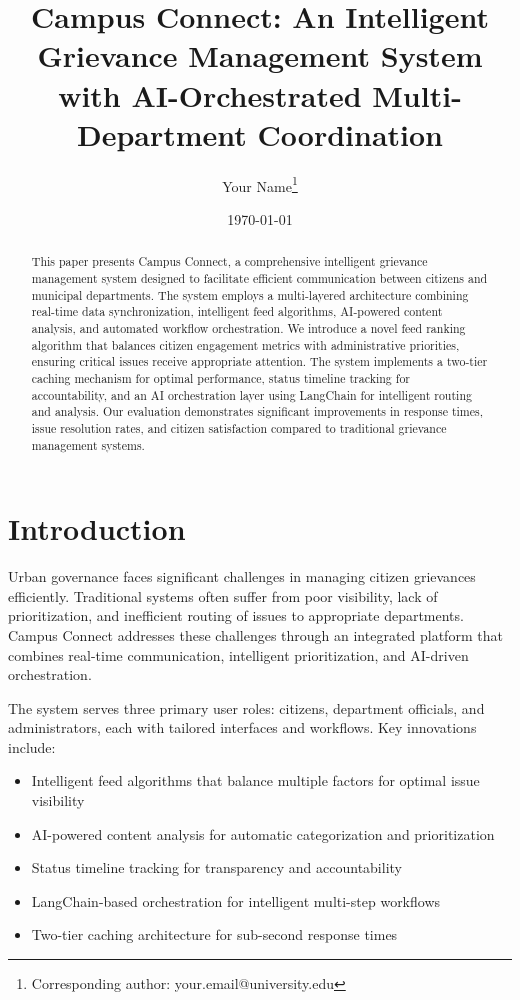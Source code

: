 \documentclass[12pt,a4paper]{article}
\title{Campus Connect: An Intelligent Grievance Management System with AI-Orchestrated Multi-Department Coordination}
\author{Your Name\thanks{Corresponding author: your.email@university.edu}}
\date{\today}
\begin{document}
\maketitle

\begin{abstract}
This paper presents Campus Connect, a comprehensive intelligent grievance management system designed to facilitate efficient communication between citizens and municipal departments. The system employs a multi-layered architecture combining real-time data synchronization, intelligent feed algorithms, AI-powered content analysis, and automated workflow orchestration. We introduce a novel feed ranking algorithm that balances citizen engagement metrics with administrative priorities, ensuring critical issues receive appropriate attention. The system implements a two-tier caching mechanism for optimal performance, status timeline tracking for accountability, and an AI orchestration layer using LangChain for intelligent routing and analysis. Our evaluation demonstrates significant improvements in response times, issue resolution rates, and citizen satisfaction compared to traditional grievance management systems.
\end{abstract}

\section{Introduction}

Urban governance faces significant challenges in managing citizen grievances efficiently. Traditional systems often suffer from poor visibility, lack of prioritization, and inefficient routing of issues to appropriate departments. Campus Connect addresses these challenges through an integrated platform that combines real-time communication, intelligent prioritization, and AI-driven orchestration.

The system serves three primary user roles: citizens, department officials, and administrators, each with tailored interfaces and workflows. Key innovations include:
\begin{itemize}
    \item Intelligent feed algorithms that balance multiple factors for optimal issue visibility
    \item AI-powered content analysis for automatic categorization and prioritization
    \item Status timeline tracking for transparency and accountability
    \item LangChain-based orchestration for intelligent multi-step workflows
    \item Two-tier caching architecture for sub-second response times
\end{itemize}
\end{document}
